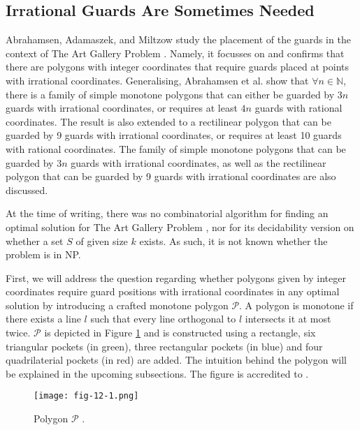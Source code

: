 \subsection{Irrational Guards Are Sometimes Needed \cite{abrahamsen2021art}}
Abrahamsen, Adamaszek, and Miltzow \cite{abrahamsen2021art} study the placement of the guards in the context of The Art Gallery Problem \cite{o1987art}. Namely, it focusses on and confirms that there are polygons with integer coordinates that require guards placed at points with irrational coordinates. Generalising, Abrahamsen et al. show that $\forall n \in \mathbb N$, there is a family of simple monotone polygons that can either be guarded by $3n$ guards with irrational coordinates, or requires at least $4n$ guards with rational coordinates. The result is also extended to a rectilinear polygon that can be guarded by 9 guards with irrational coordinates, or requires at least 10 guards with rational coordinates. The family of simple monotone polygons that can be guarded by $3n$ guards with irrational coordinates, as well as the rectilinear polygon that can be guarded by 9 guards with irrational coordinates are also discussed.


At the time of writing, there was no combinatorial algorithm for finding an optimal solution for The Art Gallery Problem \cite{o1987art}, nor for its decidability version on whether a set $S$ of given size $k$ exists. As such, it is not known whether the problem is in NP.

First, we will address the question regarding whether polygons given by integer coordinates require guard positions with irrational coordinates in any optimal solution by introducing a crafted monotone polygon $\mathcal P$. A polygon is monotone if there exists a line $l$ such that every line orthogonal to $l$ intersects it at most twice. $\mathcal P$ is depicted in Figure \ref{fig:p} and is constructed using a rectangle, six triangular pockets (in green), three rectangular pockets (in blue) and four quadrilaterial pockets (in red) are added. The intuition behind the polygon will be explained in the upcoming subsections. The figure is accredited to \cite{1057165}.

\begin{figure}[h!]
    \centering
    \texttt{[image: fig-12-1.png]}
    \caption{Polygon $\mathcal P$ \cite{1057165}.}
    \label{fig:p}
\end{figure}

